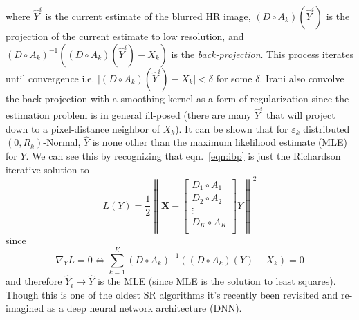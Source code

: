 where $\hat{Y}^i$ is the current estimate of the blurred HR image, $(D \circ A_k)(\hat{Y}^i)$ is the projection of the current estimate to low resolution, and $(D \circ A_k)^{-1}\left( (D \circ A_k)(\hat{Y}^i) - X_k \right)$ is the \textit{back-projection}.
%
This process iterates until convergence i.e. $\lvert (D \circ A_k)(\hat{Y}^i) - X_k \rvert < \delta$ for some $\delta$.
%
Irani \etal\cite{Irani1991ImprovingRB} also convolve the back-projection with a smoothing kernel as a form of regularization since the estimation problem is in general ill-posed (there are many $\hat{Y}^{i}$ that will project down to a pixel-distance neighbor of $X_k$).
%
It can be shown\cite{Elad1996} that for $\varepsilon_k$ distributed $(0, R_k)$-Normal, $\hat{Y}$ is none other than the maximum likelihood estimate (MLE) for $Y$.
%
We can see this by recognizing that eqn.~\ref{eqn:ibp} is just the Richardson iterative\cite{Anderssen:1972:RNM:891962} solution to
\begin{equation}
    L(Y) = \frac{1}{2} \left\| \bm{X} -  \begin{bmatrix}
                                             D_1 \circ A_1 \\
                                             D_2 \circ A_2 \\
                                             \vdots \\
                                             D_K \circ A_K \\
    \end{bmatrix}  Y  \right\|^2
    \label{eqn:l2regression}
\end{equation}
since
\begin{equation*}
    \nabla_{Y} L = 0
    \iff
    \sum_{k=1}^K (D \circ A_k)^{-1}\left( (D \circ A_k)(Y) - X_k \right) = 0
\end{equation*}
and therefore $\hat{Y}_i \rightarrow \hat{Y}$ is the MLE (since MLE is the solution to least squares\cite{CaseBerg:01}).
%
Though this is one of the oldest SR algorithms it's recently been revisited and re-imagined as a deep neural network architecture (DNN)\cite{DBLP:journals.corr.abs-1803-02735}.

